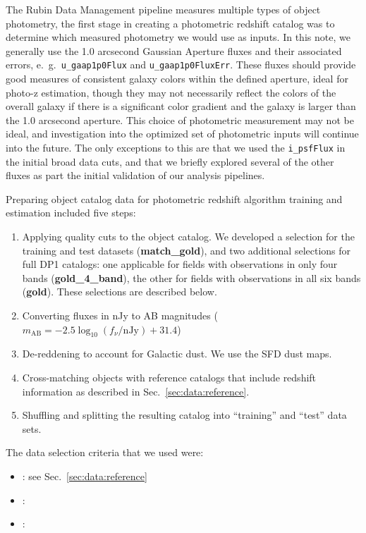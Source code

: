 The Rubin Data Management pipeline measures multiple types of object photometry, the first stage in creating a photometric redshift catalog was to determine which measured photometry we would use as inputs.  In this note, we generally use the 1.0 arcsecond Gaussian Aperture fluxes and their associated errors, e.~g.~\texttt{u\_gaap1p0Flux} and \texttt{u\_gaap1p0FluxErr}.  These fluxes should provide good measures of consistent galaxy colors within the defined aperture, ideal for photo-z estimation, though they may not necessarily reflect the colors of the overall galaxy if there is a significant color gradient and the galaxy is larger than the 1.0 arcsecond aperture.  This choice of photometric measurement may not be ideal, and investigation into the optimized set of photometric inputs will continue into the future.   The only exceptions to this are that we used the \texttt{i\_psfFlux} in the initial broad data cuts, and that we briefly explored several of the other fluxes as part the initial validation of our analysis pipelines. 

Preparing object catalog data for photometric redshift algorithm training and estimation included five steps:

\begin{enumerate}
\item{Applying quality cuts to the object catalog.   We developed a  selection for the training and test datasets (\textbf{match\_gold}), and two additional selections for full DP1 catalogs: one applicable for fields with observations in only four bands (\textbf{gold\_4\_band}), the other for fields with observations in all six bands (\textbf{gold}).  These selections are described below.}
\item{Converting fluxes in nJy to AB magnitudes ($m_\text{AB} = -2.5 \log_{10}(f_\nu / \text{nJy}) + 31.4$)}
\item{De-reddening to account for Galactic dust.  We use the SFD dust maps\citep{SFD}.}
\item{Cross-matching objects with reference catalogs that include redshift information as described in Sec.~\ref{sec:data:reference}.}
\item{Shuffling and splitting the resulting catalog into ``training'' and ``test'' data sets.}
\end{enumerate}

The data selection criteria that we used were:
\begin{itemize}
\item{: see Sec.~\ref{sec:data:reference}}
\item{: }
\item{: }
\end{itemize}

